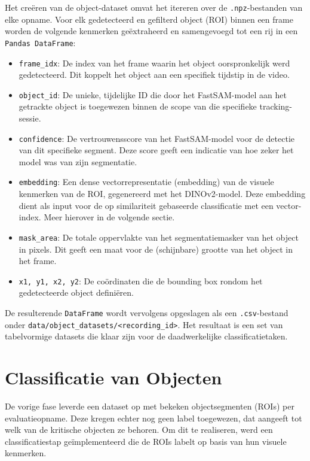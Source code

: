 Het creëren van de object-dataset omvat het itereren over de \texttt{.npz}-bestanden van elke opname. 
Voor elk gedetecteerd en gefilterd object (ROI) binnen een frame worden de volgende kenmerken geëxtraheerd en samengevoegd tot een rij in een \texttt{Pandas DataFrame}:
\begin{itemize}
    \item \texttt{frame\_idx}: De index van het frame waarin het object oorspronkelijk werd gedetecteerd. 
    Dit koppelt het object aan een specifiek tijdstip in de video.
    \item \texttt{object\_id}: De unieke, tijdelijke ID die door het FastSAM-model aan het getrackte object 
    is toegewezen binnen de scope van die specifieke tracking-sessie.
    \item \texttt{confidence}: De vertrouwensscore van het FastSAM-model voor de detectie van dit specifieke segment. 
    Deze score geeft een indicatie van hoe zeker het model was van zijn segmentatie.
    \item \texttt{embedding}: Een dense vectorrepresentatie (embedding) van de visuele kenmerken van de ROI, 
    gegenereerd met het DINOv2-model. 
    Deze embedding dient als input voor de op similariteit gebaseerde classificatie met een vector-index.
    Meer hierover in de volgende sectie.
    \item \texttt{mask\_area}: De totale oppervlakte van het segmentatiemasker van het object in pixels. 
    Dit geeft een maat voor de (schijnbare) grootte van het object in het frame.
    \item \texttt{x1, y1, x2, y2}: De coördinaten die de bounding box rondom het gedetecteerde object definiëren. 
\end{itemize}

De resulterende \texttt{DataFrame} wordt vervolgens opgeslagen 
als een \texttt{.csv}-bestand onder \texttt{data/object\_datasets/<recording\_id>}. 
Het resultaat is een set van tabelvormige datasets die klaar zijn voor de daadwerkelijke classificatietaken.

\section{Classificatie van Objecten}

De vorige fase leverde een dataset op met bekeken objectsegmenten (ROIs) per evaluatieopname.
Deze kregen echter nog geen label toegewezen, dat aangeeft tot welk van de kritische objecten ze behoren.
Om dit te realiseren, werd een classificatiestap geïmplementeerd die de ROIs labelt op basis van hun visuele kenmerken.

